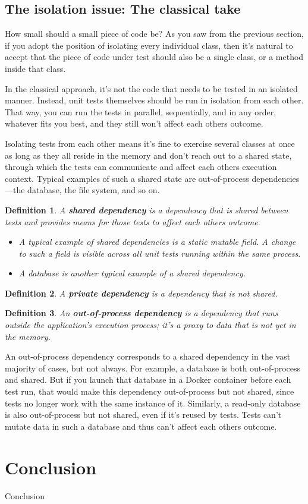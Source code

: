 \documentclass{article}
\newtheorem{definition}{Definition}
\begin{document}
\subsection{The isolation issue: The classical take}
How small should a small piece of code be? As you saw from the previous section, if you adopt the position of isolating every individual class, then it’s natural to accept that the piece of code under test should also be a single class, or a method inside that class. 

In the classical approach, it’s not the code that needs to be tested in an isolated manner. Instead, unit tests themselves should be run in isolation from each other. That way, you can run the tests in parallel, sequentially, and in any order, whatever fits you best, and they still won’t affect each others outcome.

Isolating tests from each other means it’s fine to exercise several classes at once as long as they all reside in the memory and don’t reach out to a shared state, through which the tests can communicate and affect each others execution context. Typical examples of such a shared state are out-of-process dependencies—the database, the file system, and so on.

\begin{definition}
A \textbf{shared dependency} is a dependency that is shared between tests and provides means for those tests to affect each others outcome. 
\begin{itemize}
	\item A typical example of shared dependencies is a static mutable field. A change to such a field is visible across all unit tests running within the same process. 
	\item A database is another typical example of a shared dependency.
\end{itemize}
\end{definition}

\begin{definition}
A \textbf{private dependency} is a dependency that is not shared.
\end{definition}

\begin{definition}
An \textbf{out-of-process dependency} is a dependency that runs outside the application’s execution process; it’s a proxy to data that is not yet in the memory. 
\end{definition}

 An out-of-process dependency corresponds to a shared dependency in the vast majority of cases, but not always. For example, a database is both out-of-process and shared. But if you launch that database in a Docker container before each test run, that would make this dependency out-of-process but not shared, since tests no longer work with the same instance of it. Similarly, a read-only database is also out-of-process but not shared, even if it’s reused by tests. Tests can’t mutate data in such a database and thus can’t affect each others outcome.

\section{Conclusion}

Conclusion


\newpage

 

\end{document}
